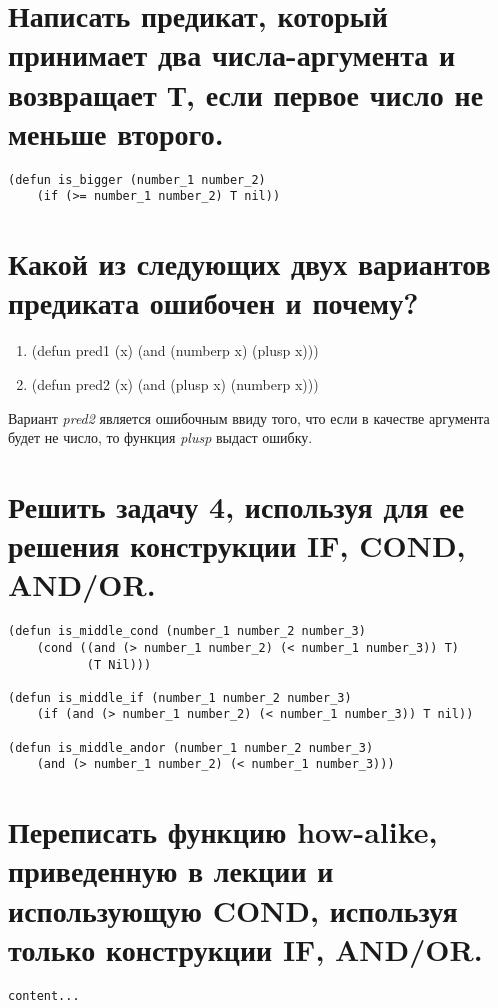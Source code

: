 \section{Написать предикат, который принимает два числа-аргумента и возвращает Т, если первое число не меньше второго.}
\begin{lstlisting}[caption=Задание 6]
(defun is_bigger (number_1 number_2)
	(if (>= number_1 number_2) T nil))
\end{lstlisting}

\section{Какой из следующих двух вариантов предиката ошибочен и почему?}
\begin{enumerate}
	\item (defun pred1 (x) (and (numberp x) (plusp x)))
	
	\item (defun pred2 (x) (and (plusp x) (numberp x)))
\end{enumerate}

Вариант \textit{pred2} является ошибочным ввиду того, что если в качестве аргумента будет не число, то функция \textit{plusp} выдаст ошибку. 

\section{Решить задачу 4, используя для ее решения конструкции IF, COND, AND/OR.}
\begin{lstlisting}[caption=Задание 8]
(defun is_middle_cond (number_1 number_2 number_3)
	(cond ((and (> number_1 number_2) (< number_1 number_3)) T) 
		   (T Nil)))
	
(defun is_middle_if (number_1 number_2 number_3)
	(if (and (> number_1 number_2) (< number_1 number_3)) T nil))
	
(defun is_middle_andor (number_1 number_2 number_3)
	(and (> number_1 number_2) (< number_1 number_3)))
\end{lstlisting}

\section{Переписать функцию how-alike, приведенную в лекции и использующую COND, используя только конструкции IF, AND/OR.}
\begin{lstlisting}[caption=Задание 9]
	content...
\end{lstlisting}